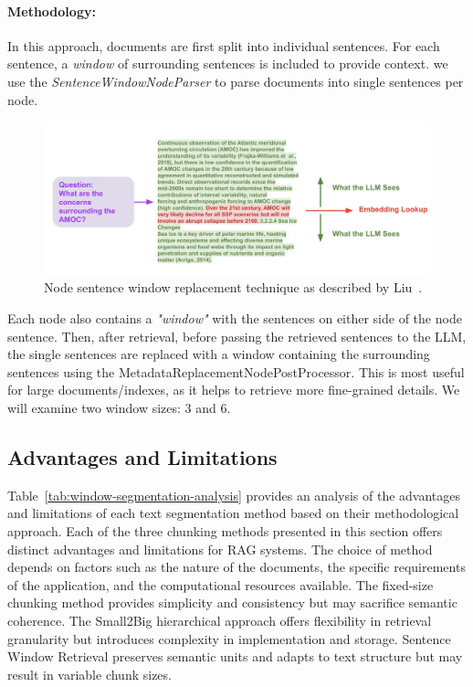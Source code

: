 \paragraph{Methodology:}
In this approach, documents are first split into individual sentences.
For each sentence, a \textit{window} of surrounding sentences is included to provide context.
we use the \textit{SentenceWindowNodeParser} to parse documents into single sentences per node.
\begin{figure}[ht!]
    \centering
    \begin{minipage}[b]{\textwidth}
        \centering
        \includegraphics[width=\textwidth]{res/window-ret}
        \caption{Node sentence window replacement technique as described by Liu~\cite{liu2023tweet}.}
        \label{fig:window-ret}
    \end{minipage}
\end{figure}
Each node also contains a \textit{"window"} with the sentences on either side of the node sentence.
Then, after retrieval, before passing the retrieved sentences to the LLM, the single sentences are replaced with a window containing the surrounding sentences using the MetadataReplacementNodePostProcessor.
This is most useful for large documents/indexes, as it helps to retrieve more fine-grained details.
We will examine two window sizes: 3 and 6.
\subsection{Advantages and Limitations}\label{subsec:advantages-and-limitations}
Table~\ref{tab:window-segmentation-analysis} provides an analysis of the advantages and limitations of each text segmentation method based on their methodological approach.
Each of the three chunking methods presented in this section offers distinct advantages and limitations for RAG systems.
The choice of method depends on factors such as the nature of the documents, the specific requirements of the application, and the computational resources available.
The fixed-size chunking method provides simplicity and consistency but may sacrifice semantic coherence.
The Small2Big hierarchical approach offers flexibility in retrieval granularity but introduces complexity in implementation and storage.
Sentence Window Retrieval preserves semantic units and adapts to text structure but may result in variable chunk sizes.

